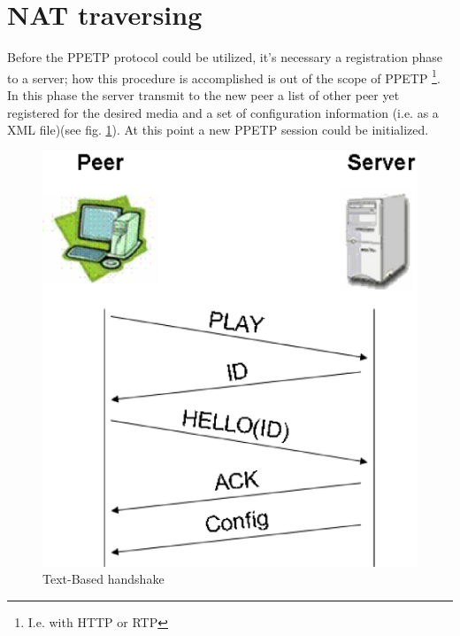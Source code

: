 \section{NAT traversing}
\label{sec: NatTraversing}

Before the PPETP protocol could be utilized, it's necessary a registration phase to a server; how this procedure is accomplished is out of the scope of PPETP \footnote{I.e. with HTTP or RTP}. In this phase the server transmit to the new peer a list of other peer yet registered for the desired media and a set of configuration information (i.e. as a XML file)(see fig. \ref{fig:text_phase}). At this point a new PPETP session could be initialized. 
\begin{figure}[htbp]
	\centering
		\includegraphics[scale=0.5]{text_phase.eps}
	\caption[Text-Based handshake]{Text-Based handshake}
	\label{fig:text_phase}	
\end{figure}


